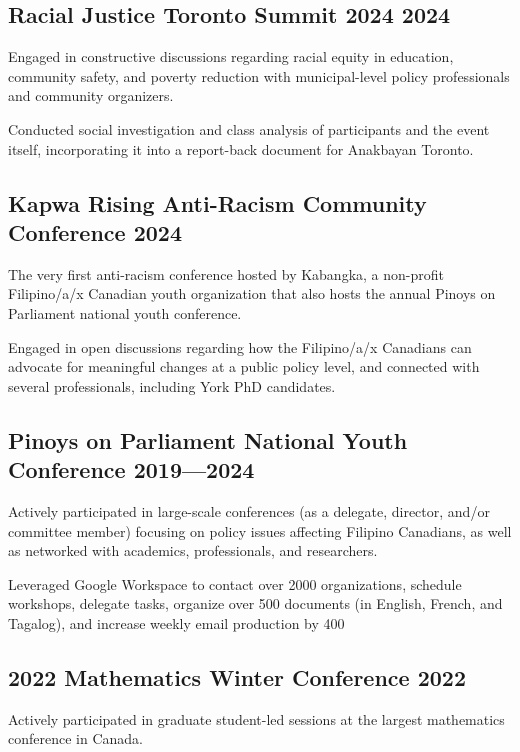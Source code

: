 


\subsection{{Racial Justice Toronto Summit 2024 \hfill 2024}}
\begin{zitemize}
\item Engaged in constructive discussions regarding racial equity in education, community safety, and poverty 
reduction with municipal-level policy professionals and community organizers.
\item Conducted social investigation and class analysis of participants and the event itself, incorporating it into a 
report-back document for Anakbayan Toronto. 
\end{zitemize}

\subsection{{Kapwa Rising Anti-Racism Community Conference \hfill 2024}}
\begin{zitemize}
\item  The very first anti-racism conference hosted by Kabangka, a non-profit Filipino/a/x Canadian youth organization that also hosts the annual Pinoys on Parliament national youth conference.
\item Engaged in open discussions regarding how the Filipino/a/x Canadians can advocate for meaningful changes at a public policy level, and connected with several professionals, including York PhD candidates.
\end{zitemize}

\subsection{{Pinoys on Parliament National Youth Conference \hfill 2019---2024}}
\begin{zitemize}
\item  Actively participated in large-scale conferences (as a delegate, director, and/or committee member) focusing on policy issues affecting Filipino Canadians, as well as networked with academics, professionals, and researchers.
\item Leveraged Google Workspace to contact over 2000 organizations, schedule workshops, delegate tasks, organize over 500 documents (in English, French, and Tagalog), and increase weekly email production by 400%
\end{zitemize}

\subsection{{2022 Mathematics Winter Conference \hfill 2022}}
\begin{zitemize}
\item Actively participated in graduate student-led sessions at the largest mathematics conference in Canada.
\end{zitemize}